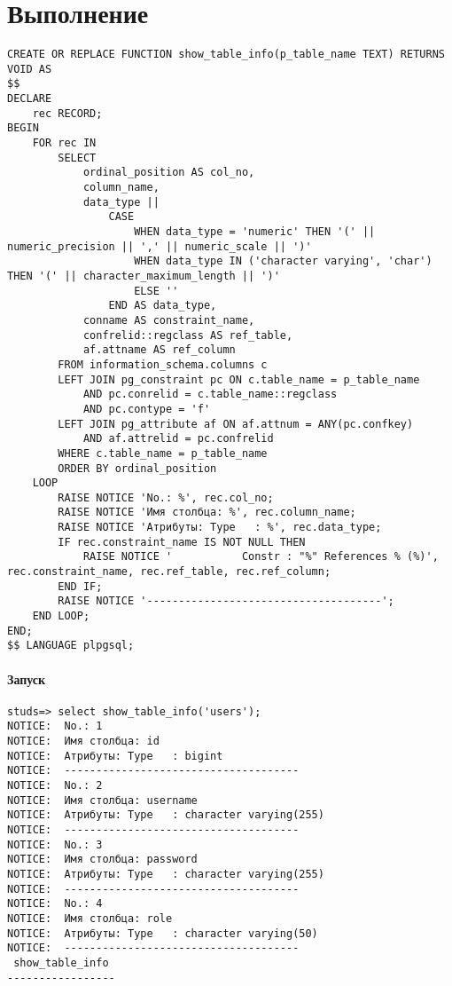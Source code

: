 \section{Выполнение}

\begin{verbatim}
CREATE OR REPLACE FUNCTION show_table_info(p_table_name TEXT) RETURNS VOID AS
$$
DECLARE
    rec RECORD;
BEGIN
    FOR rec IN 
        SELECT 
            ordinal_position AS col_no,
            column_name,
            data_type || 
                CASE 
                    WHEN data_type = 'numeric' THEN '(' || numeric_precision || ',' || numeric_scale || ')'
                    WHEN data_type IN ('character varying', 'char') THEN '(' || character_maximum_length || ')'
                    ELSE ''
                END AS data_type,
            conname AS constraint_name,
            confrelid::regclass AS ref_table,
            af.attname AS ref_column
        FROM information_schema.columns c
        LEFT JOIN pg_constraint pc ON c.table_name = p_table_name
            AND pc.conrelid = c.table_name::regclass
            AND pc.contype = 'f'
        LEFT JOIN pg_attribute af ON af.attnum = ANY(pc.confkey) 
            AND af.attrelid = pc.confrelid
        WHERE c.table_name = p_table_name
        ORDER BY ordinal_position
    LOOP
        RAISE NOTICE 'No.: %', rec.col_no;
        RAISE NOTICE 'Имя столбца: %', rec.column_name;
        RAISE NOTICE 'Атрибуты: Type   : %', rec.data_type;
        IF rec.constraint_name IS NOT NULL THEN
            RAISE NOTICE '           Constr : "%" References % (%)', rec.constraint_name, rec.ref_table, rec.ref_column;
        END IF;
        RAISE NOTICE '-------------------------------------';
    END LOOP;
END;
$$ LANGUAGE plpgsql;

\end{verbatim}

\paragraph{Запуск}

\begin{verbatim}
studs=> select show_table_info('users');
NOTICE:  No.: 1
NOTICE:  Имя столбца: id
NOTICE:  Атрибуты: Type   : bigint
NOTICE:  -------------------------------------
NOTICE:  No.: 2
NOTICE:  Имя столбца: username
NOTICE:  Атрибуты: Type   : character varying(255)
NOTICE:  -------------------------------------
NOTICE:  No.: 3
NOTICE:  Имя столбца: password
NOTICE:  Атрибуты: Type   : character varying(255)
NOTICE:  -------------------------------------
NOTICE:  No.: 4
NOTICE:  Имя столбца: role
NOTICE:  Атрибуты: Type   : character varying(50)
NOTICE:  -------------------------------------
 show_table_info
-----------------
\end{verbatim}
